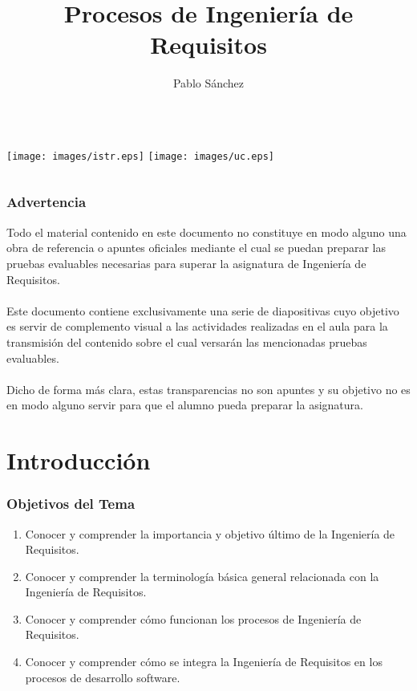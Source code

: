 \documentclass[handout,a4paper,slidestop,xcolor=pst,dvips,blue]{beamer}
\title[Procesos Ing. Requisitos]{Procesos de Ingeniería de Requisitos}
\author[Pablo Sánchez]{\alert{Pablo Sánchez}}
\institute[I2E]{
		   Dpto. Ingeniería Informática y Electrónica \\
		   Universidad de Cantabria \\
		   Santander (Cantabria, España) \\
		   \texttt{p.sanchez@unican.es}
}
\date{}
\begin{document}
\begin{frame}[c]
	\titlepage
	\begin{columns}
			\centering
			\texttt{[image: images/istr.eps]}
			\centering
			\texttt{[image: images/uc.eps]}
    \end{columns}
\end{frame}

\begin{frame}[c]
    \frametitle{\alert{Advertencia}}
    \begin{center}
        Todo el material contenido en este documento  no constituye en modo alguno una obra de referencia o apuntes oficiales mediante el cual se puedan preparar las pruebas evaluables necesarias para superar la asignatura de Ingeniería de Requisitos. \ \\
        \ \\
        Este documento contiene exclusivamente una serie de diapositivas cuyo objetivo es servir de complemento visual a las actividades realizadas en el aula para la transmisión del contenido sobre el cual versarán las mencionadas pruebas evaluables.  \ \\
        \ \\
        Dicho de forma más clara, \alert{estas transparencias no son apuntes y su objetivo no es en modo alguno servir para que el alumno pueda preparar la asignatura.}
    \end{center}
\end{frame}

\section{Introducción}

\begin{frame}[c]
    \frametitle{Objetivos del Tema}
    \begin{enumerate}[<+->]
         \item Conocer y comprender la importancia y objetivo último de la Ingeniería de Requisitos.
         \item Conocer y comprender la terminología básica general relacionada con la Ingeniería de Requisitos.
         \item Conocer y comprender cómo funcionan los procesos de Ingeniería de Requisitos.
         \item Conocer y comprender cómo se integra la Ingeniería de Requisitos en los procesos de desarrollo software.
    \end{enumerate}
\end{frame}
\end{document}
